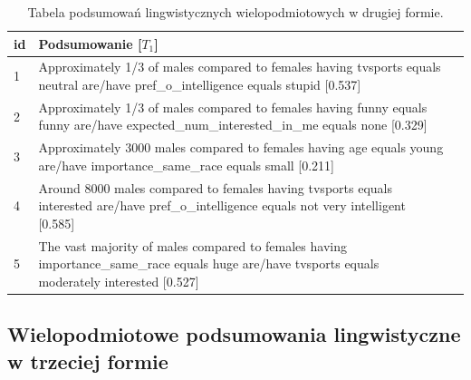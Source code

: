 \documentclass{classrep}
\begin{document}
\begin{center}
  \begin{table}[H]
    \begin{tabularx}{\textwidth}{lXc}
    
    id & Podsumowanie [$T_1$]\\ \hline 
  
    1 & Approximately 1/3 of males compared to females having tvsports equals neutral are/have pref\_o\_intelligence equals stupid [0.537] \\\hline
    2 & Approximately 1/3 of males compared to females having funny equals funny are/have expected\_num\_interested\_in\_me equals none [0.329]\\  \hline
    3 & Approximately 3000 males compared to females having age equals young are/have importance\_same\_race equals small [0.211] \\ \hline
    4 & Around 8000 males compared to females having tvsports equals interested are/have pref\_o\_intelligence equals not very intelligent [0.585]\\ \hline
    5 & The vast majority of males compared to females having importance\_same\_race equals huge are/have tvsports equals moderately interested [0.527]\\ \hline
  \end{tabularx}
  \caption{Tabela podsumowań lingwistycznych wielopodmiotowych w drugiej formie.}
\end{table}
\end{center}

\subsection{Wielopodmiotowe podsumowania lingwistyczne w trzeciej formie}
\end{document}
